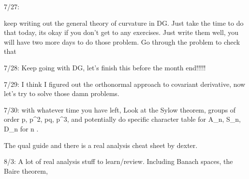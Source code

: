 7/27:

keep writing out the general theory of curvature in DG. Just take the time to do that today, its okay if you don't get to any exercises. Just write them well, you will have two more days to do those problem. Go through the problem to check that 


7/28: Keep going with DG, let's finish this before the month end!!!!!

7/29: I think I figured out the orthonormal approach to covariant derivative, now let's try to solve those damn problems.



7/30: with whatever time you have left, Look at the Sylow theorem, groups of order p, p^2, pq, p^3, and potentially do specific character table for A_n, S_n, D_n for n . 



The qual guide and there is a real analysis cheat sheet by dexter. 

8/3: A lot of real analysis stuff to learn/review. Including Banach spaces, the Baire theorem, 